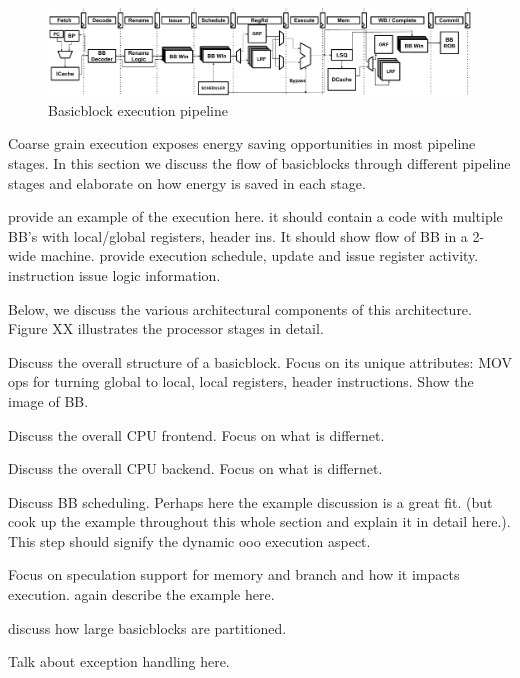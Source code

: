 \begin{figure}
	\centering
	\includegraphics[width=\textwidth]{fig/pipeline.pdf} 
	\caption{Basicblock execution pipeline}
	\label{fig:pipeline}
\end{figure}

Coarse grain execution exposes energy saving opportunities in most pipeline
stages. In this section we discuss the flow of basicblocks through different
pipeline stages and elaborate on how energy is saved in each stage.


provide an example of the execution here.  it should contain a code with
multiple BB's with local/global registers, header ins.  It should show flow of
BB in a 2-wide machine. provide execution schedule, update and issue register
activity. instruction issue logic information.

Below, we discuss the various architectural components of this architecture.
Figure XX illustrates the processor stages in detail.

Discuss the overall structure of a basicblock. Focus on its unique attributes:
MOV ops for turning global to local, local registers, header instructions. Show
the image of BB.


Discuss the overall CPU frontend. Focus on what is differnet.


Discuss the overall CPU backend. Focus on what is differnet.


Discuss BB scheduling. Perhaps here the example discussion is a great fit. (but
        cook up the example throughout this whole section and explain it in
        detail here.). This step should signify the dynamic ooo execution
aspect.


Focus on speculation support for memory and branch and how it impacts execution.
again describe the example here.


discuss how large basicblocks are partitioned.


Talk about exception handling here.
